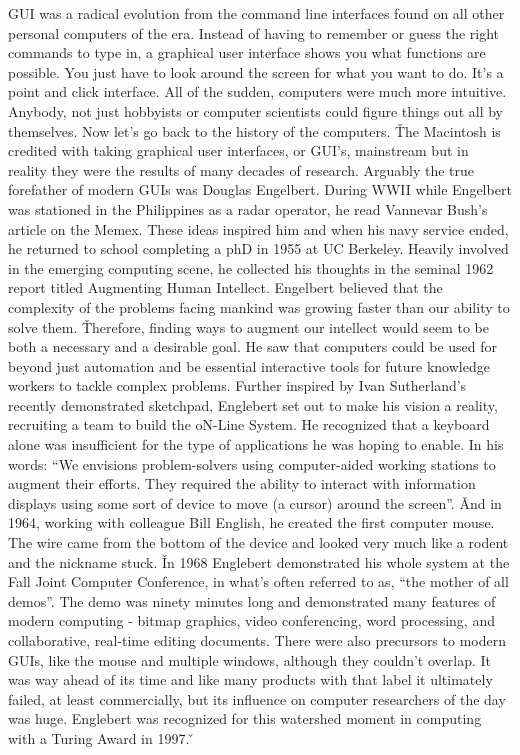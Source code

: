 GUI was a radical evolution from the command line interfaces found on all other personal computers of the era.
Instead of having to remember or guess the right commands to type in, a graphical user interface shows you what
functions are possible. You just have to look around the screen for what you want to do. It's a point and click
interface. All of the sudden, computers were much more intuitive. Anybody, not just hobbyists or computer scientists
could figure things out all by themselves. Now let's go back to the history of the computers. \v

The Macintosh is credited with taking graphical user interfaces, or GUI's, mainstream but in reality they were the
results of many decades of research. Arguably the true forefather of modern GUIs was Douglas Engelbert. During WWII
while Engelbert was stationed in the Philippines as a radar operator, he read Vannevar Bush's article on the Memex.
These ideas inspired him and when his navy service ended, he returned to school completing a phD in 1955 at UC
Berkeley. Heavily involved in the emerging computing scene, he collected his thoughts in the seminal 1962 report
titled Augmenting Human Intellect. Engelbert believed that the complexity of the problems facing mankind was growing
faster than our ability to solve them. \v

Therefore, finding ways to augment our intellect would seem to be both a necessary and a desirable goal. He saw that
computers could be used for beyond just automation and be essential interactive tools for future knowledge workers to
tackle complex problems. Further inspired by Ivan Sutherland's recently demonstrated sketchpad, Englebert set out to
make his vision a reality, recruiting a team to build the oN-Line System. He recognized that a keyboard alone was
insufficient for the type of applications he was hoping to enable. In his words: ``We envisions problem-solvers using
computer-aided working stations to augment their efforts. They required the ability to interact with information
displays using some sort of device to move (a cursor) around the screen''. \v

And in 1964, working with colleague Bill English, he created the first computer mouse. The wire came from the bottom
of the device and looked very much like a rodent and the nickname stuck. \v

In 1968 Englebert demonstrated his whole system at the Fall Joint Computer Conference, in what's often referred to
as, ``the mother of all demos''. The demo was ninety minutes long and demonstrated many features of modern computing
- bitmap graphics, video conferencing, word processing, and collaborative, real-time editing documents. There were
also precursors to modern GUIs, like the mouse and multiple windows, although they couldn't overlap. It was way ahead
of its time and like many products with that label it ultimately failed, at least commercially, but its influence on
computer researchers of the day was huge. Englebert was recognized for this watershed moment in computing with a
Turing Award in 1997. \v

